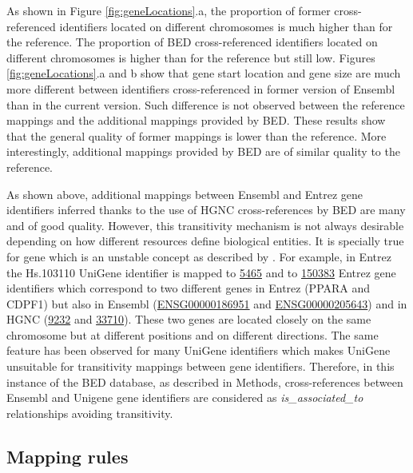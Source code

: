 \documentclass[9pt,a4paper,]{extarticle}
\theoremstyle{definition}
\theoremstyle{definition}
\theoremstyle{definition}
\theoremstyle{remark}
\begin{document}
As shown in Figure \ref{fig:geneLocations}.a,
the proportion of former cross-referenced identifiers located on different
chromosomes is much higher than for the reference.
The proportion of BED cross-referenced identifiers located on different
chromosomes is higher than for the reference but still low.
Figures \ref{fig:geneLocations}.a and b show that gene start location
and gene size are much more
different between identifiers cross-referenced in former version
of Ensembl than in the current version.
Such difference is not observed between the reference mappings and the
additional mappings provided by BED.
These results show that the general quality of former mappings is lower
than the reference. More interestingly, additional mappings provided by BED
are of similar quality to the reference.

As shown above, additional mappings between Ensembl and Entrez gene identifiers
inferred thanks to the use of HGNC cross-references by BED are many and of good
quality. However, this transitivity mechanism is not always desirable
depending on how different resources define biological entities.
It is specially true for gene which is an unstable concept as described
by \citet{gerstein_what_2007}.
For example, in Entrez the Hs.103110 UniGene identifier is mapped
to \href{https://www.ncbi.nlm.nih.gov/gene/5465}{5465} and
to \href{https://www.ncbi.nlm.nih.gov/gene/150383}{150383}
Entrez gene identifiers which correspond to two different genes
in Entrez (PPARA and CDPF1) but also in
Ensembl (\href{http://www.ensembl.org/id/ENSG00000186951}{ENSG00000186951}
and \href{http://www.ensembl.org/id/ENSG00000205643}{ENSG00000205643})
and in HGNC (\href{http://www.genenames.org/cgi-bin/gene_symbol_report?hgnc_id=9232}{9232}
and \href{http://www.genenames.org/cgi-bin/gene_symbol_report?hgnc_id=33710}{33710}).
These two genes are located closely on the same chromosome but
at different positions and on different directions.
The same feature has been observed for many UniGene identifiers which makes
UniGene unsuitable for transitivity mappings between gene identifiers.
Therefore, in this instance of the BED database, as described in Methods,
cross-references between Ensembl and Unigene gene identifiers are considered
as \emph{is\_associated\_to} relationships avoiding transitivity.

\subsection{Mapping rules}\label{mapping-rules}
\end{document}
